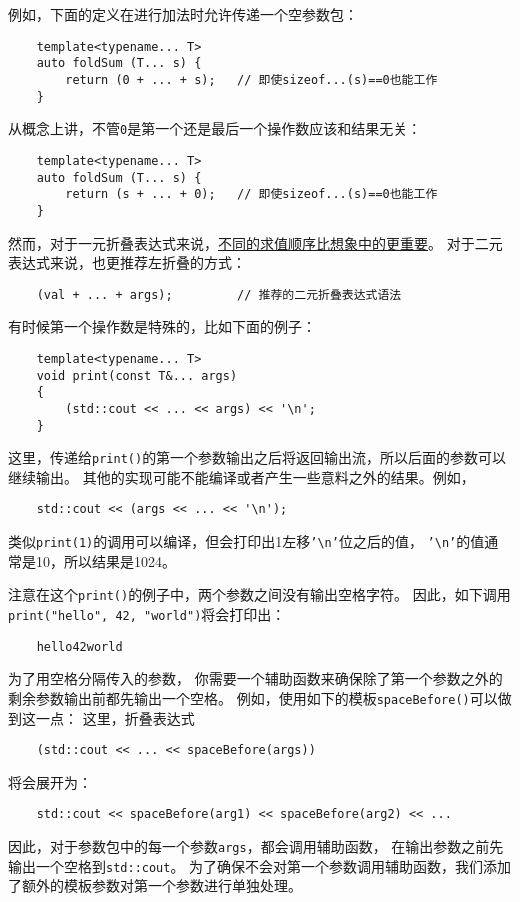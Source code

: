 例如，下面的定义在进行加法时允许传递一个空参数包：
\begin{lstlisting}
    template<typename... T>
    auto foldSum (T... s) {
        return (0 + ... + s);   // 即使sizeof...(s)==0也能工作
    }
\end{lstlisting}
从概念上讲，不管\texttt{0}是第一个还是最后一个操作数应该和结果无关：
\begin{lstlisting}
    template<typename... T>
    auto foldSum (T... s) {
        return (s + ... + 0);   // 即使sizeof...(s)==0也能工作
    }
\end{lstlisting}
然而，对于一元折叠表达式来说，\hyperref[ch11.2]{不同的求值顺序比想象中的更重要}。
对于二元表达式来说，也更推荐左折叠的方式：
\begin{lstlisting}
    (val + ... + args);         // 推荐的二元折叠表达式语法
\end{lstlisting}
有时候第一个操作数是特殊的，比如下面的例子：
\label{输出任意个参数的print}
\begin{lstlisting}
    template<typename... T>
    void print(const T&... args)
    {
        (std::cout << ... << args) << '\n';
    }
\end{lstlisting}
这里，传递给\texttt{print()}的第一个参数输出之后将返回输出流，所以后面的参数可以继续输出。
其他的实现可能不能编译或者产生一些意料之外的结果。例如，
\begin{lstlisting}
    std::cout << (args << ... << '\n');
\end{lstlisting}
类似\texttt{print(1)}的调用可以编译，但会打印出1左移\texttt{'\textbackslash n'}位之后的值，
\texttt{'\textbackslash n'}的值通常是10，所以结果是1024。

注意在这个\texttt{print()}的例子中，两个参数之间没有输出空格字符。
因此，如下调用\texttt{print("hello", 42, "world")}将会打印出：
\begin{lstlisting}
    hello42world
\end{lstlisting}
为了用空格分隔传入的参数，
你需要一个辅助函数来确保除了第一个参数之外的剩余参数输出前都先输出一个空格。
例如，使用如下的模板\texttt{spaceBefore()}可以做到这一点：
这里，折叠表达式
\begin{lstlisting}
    (std::cout << ... << spaceBefore(args))
\end{lstlisting}
将会展开为：
\begin{lstlisting}
    std::cout << spaceBefore(arg1) << spaceBefore(arg2) << ...
\end{lstlisting}
因此，对于参数包中的每一个参数\texttt{args}，都会调用辅助函数，
在输出参数之前先输出一个空格到\texttt{std::cout}。
为了确保不会对第一个参数调用辅助函数，我们添加了额外的模板参数对第一个参数进行单独处理。

